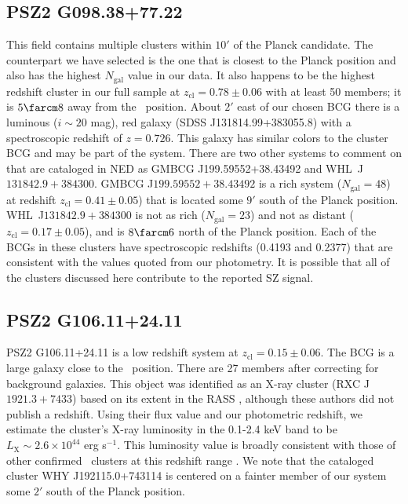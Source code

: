 \documentclass[apj, revtex4-1]{emulateapj}
\begin{document}
\subsection{PSZ2 G098.38+77.22} %
This field contains multiple clusters within $10'$ of the Planck candidate. The counterpart we have selected is the one that is closest to the Planck position and also has the highest $N_\mathrm{gal}$ value in our data. It also happens to be the highest redshift cluster in our full sample at $z_\mathrm{cl} = 0.78 \pm 0.06$ with at least 50 members; it is $5\farcm8$ away from the \planck\ position. About $2'$ east of our chosen BCG there is a luminous ($i\sim 20$ mag), red galaxy (SDSS J131814.99+383055.8) with a spectroscopic redshift of $z=0.726$. This galaxy has similar colors to the cluster BCG and may be part of the system. There are two other systems to comment on that are cataloged in NED as GMBCG J199.59552+38.43492 and WHL~J$131842.9+384300$. GMBCG J$199.59552+38.43492$ is a rich system ($N_\mathrm{gal} = 48$) at redshift $z_\mathrm{cl}=0.41 \pm 0.05$) that is located some $9'$ south of the Planck position.
\hbox{WHL J$131842.9+384300$} is not as rich ($N_\mathrm{gal} = 23$) and not as distant ($z_\mathrm{cl}=0.17 \pm 0.05$), and is $8\farcm6$ north of the Planck position. Each of the BCGs in these clusters have spectroscopic redshifts (0.4193 and 0.2377) that are consistent with the values quoted from our photometry. It is possible that all of the clusters discussed here contribute to the reported SZ signal.

\subsection{PSZ2 G106.11+24.11} %
PSZ2 G106.11+24.11 is a low redshift system at $z_\mathrm{cl} = 0.15 \pm 0.06$. The BCG is a large galaxy close to the \planck\ position. There are 27 members after correcting for background galaxies. This object was identified as an X-ray cluster (RXC J$1921.3+7433$) based on its extent in the RASS \citep{Bohringer2000}, although these authors did not publish a redshift. Using their flux value and our photometric redshift, we estimate the cluster's X-ray luminosity in the 0.1-2.4 keV band to be $L_\mathrm{X} \sim 2.6\times 10^{44}$ erg s$^{-1}$.
This luminosity value is broadly consistent with those of other confirmed \planck\ clusters at this redshift range \citep{PlanckCollaboration2015}. We note that the cataloged cluster WHY J192115.0+743114 is centered on a fainter member of our system some $2'$ south of the Planck position.
\end{document}
